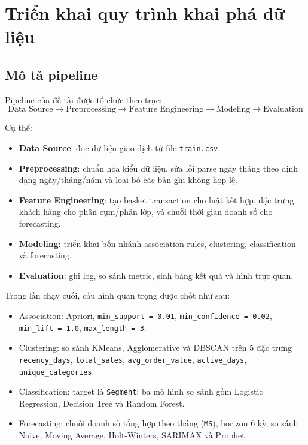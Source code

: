 \chapter{Triển khai quy trình khai phá dữ liệu}\label{chapter_overview}

\section{Mô tả pipeline}

Pipeline của đề tài được tổ chức theo trục:
\[
\text{Data Source} \rightarrow \text{Preprocessing} \rightarrow \text{Feature Engineering} \rightarrow \text{Modeling} \rightarrow \text{Evaluation}
\]

Cụ thể:
\begin{itemize}
\item \textbf{Data Source}: đọc dữ liệu giao dịch từ file \texttt{train.csv}.
\item \textbf{Preprocessing}: chuẩn hóa kiểu dữ liệu, sửa lỗi parse ngày tháng theo định dạng ngày/tháng/năm và loại bỏ các bản ghi không hợp lệ.
\item \textbf{Feature Engineering}: tạo basket transaction cho luật kết hợp, đặc trưng khách hàng cho phân cụm/phân lớp, và chuỗi thời gian doanh số cho forecasting.
\item \textbf{Modeling}: triển khai bốn nhánh association rules, clustering, classification và forecasting.
\item \textbf{Evaluation}: ghi log, so sánh metric, sinh bảng kết quả và hình trực quan.
\end{itemize}

Trong lần chạy cuối, cấu hình quan trọng được chốt như sau:
\begin{itemize}
\item Association: Apriori, \texttt{min\_support = 0.01}, \texttt{min\_confidence = 0.02}, \texttt{min\_lift = 1.0}, \texttt{max\_length = 3}.
\item Clustering: so sánh KMeans, Agglomerative và DBSCAN trên 5 đặc trưng \texttt{recency\_days}, \texttt{total\_sales}, \texttt{avg\_order\_value}, \texttt{active\_days}, \texttt{unique\_categories}.
\item Classification: target là \texttt{Segment}; ba mô hình so sánh gồm Logistic Regression, Decision Tree và Random Forest.
\item Forecasting: chuỗi doanh số tổng hợp theo tháng (\texttt{MS}), horizon 6 kỳ, so sánh Naive, Moving Average, Holt-Winters, SARIMAX và Prophet.
\end{itemize}

